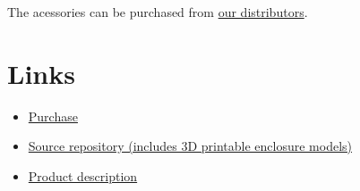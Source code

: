 \documentclass{zubaxdoc}
\begin{document}
The acessories can be purchased from \href{https://zubax.com/sales-network}{our distributors}.

\chapter{Links}

\begin{itemize}
\item \href{http://shop.titaneliteinc.com/index.php?route=product/product&product_id=1004}{Purchase}
\item \href{https://github.com/Zubax/zubax_babel}{Source repository (includes 3D printable enclosure models)}
\item \href{http://zubax.com/product/zubax-babel}{Product description}
\end{itemize}

\fi
\end{document}
